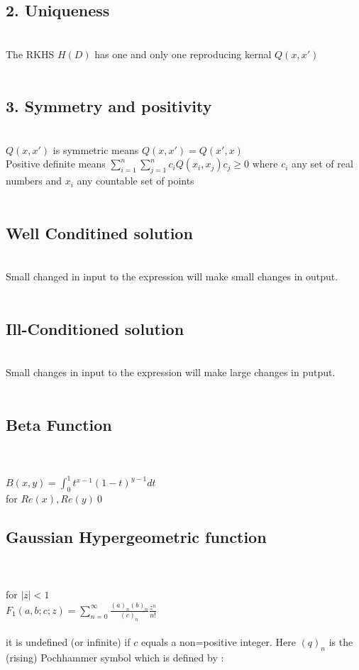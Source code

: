     \subsection{ 2. Uniqueness}\\
    The RKHS $H(D)$ has one and only one reproducing kernal $Q(x,x')$\\\\
    \subsection{3. Symmetry and positivity}\\
    $Q(x,x')$ is symmetric  means $ Q(x,x') = Q(x',x)$\\
     Positive definite means $\sum_{i =1}^n \sum_{j=1}^n c_{i}Q(x_{i}, x_{j})c_{j}\geq 0$ where $c_{i}$  any set of real numbers and $x_{i}$ any countable set of points\\\\
  \subsection{Well Conditined solution}\\
  Small changed in input to the expression will make small changes in output.\\\\
  \subsection{Ill-Conditioned solution}\\
   Small changes in input to the expression will make large changes in putput.\\\\
   \subsection{Beta Function}\\\\
   $B(x,y) = \int_0^1 {t^{x-1}}{(1-t)^{y-1}}dt$\\
   for $Re(x), Re(y) \>0$\\
   \subsection{Gaussian Hypergeometric function}\\\\
   for $|z| <1 $\\
   $F_{1}(a,b;c;z) = \sum_{n=0}^\infty\frac{(a)_{n}(b)_{n}}{(c)_n}\frac{z^{n}}{n!}$\\\\
   it is undefined (or infinite) if $c$ equals a non=positive integer. Here $(q)_{n}$ is the (rising) Pochhammer symbol which is defined by :\\\\
   
